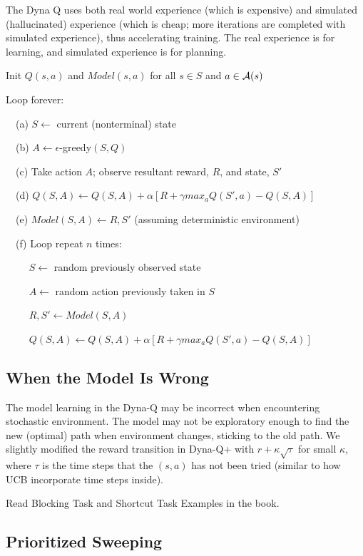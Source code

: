\documentclass[sutton_barto_notes.tex]{subfiles}
\begin{document}
The Dyna Q uses both real world experience (which is expensive) and simulated (hallucinated) experience (which is cheap; more iterations are completed with simulated experience), thus accelerating training. The real experience is for learning, and simulated experience is for planning.

\begin{tcolorbox}[width=1.1\textwidth,title={Tabular Dyna-Q}]
Init $Q(s,a)$ and $Model(s,a)$ for all $s \in S$ and $a \in \operatorname*{\mathcal{A}}(s)$

Loop forever:

$\quad$(a) $S \leftarrow$ current (nonterminal) state

$\quad$(b) $A \leftarrow \epsilon$-greedy$(S,Q)$

$\quad$(c) Take action $A$; observe resultant reward, $R$, and state, $S'$

$\quad$(d) $Q(S,A)\leftarrow Q(S,A)+\alpha [R + \gamma max_a Q(S',a) - Q(S,A)]$

$\quad$(e) $Model(S,A) \leftarrow R,S'$ (assuming deterministic environment)

$\quad$(f) Loop repeat $n$ times:

$\quad\quad$ $S \leftarrow$ random previously observed state

$\quad\quad$ $A \leftarrow$ random action previously taken in $S$

$\quad\quad$ $R, S' \leftarrow Model(S,A)$

$\quad\quad$ $Q(S,A)\leftarrow Q(S,A)+\alpha [R+\gamma max_a Q(S',a) - Q(S,A)]$
\end{tcolorbox}

\subsection{When the Model Is Wrong}

The model learning in the Dyna-Q may be incorrect when encountering stochastic environment. The model may not be exploratory enough to find the new (optimal) path when environment changes, sticking to the old path. We slightly modified the reward transition in Dyna-Q+ with $r+\kappa\sqrt{\tau}$ for small $\kappa$, where $\tau$ is the time steps that the $(s,a)$ has not been tried (similar to how UCB incorporate time steps inside).

Read Blocking Task and Shortcut Task Examples in the book.

\subsection{Prioritized Sweeping}
\end{document}
